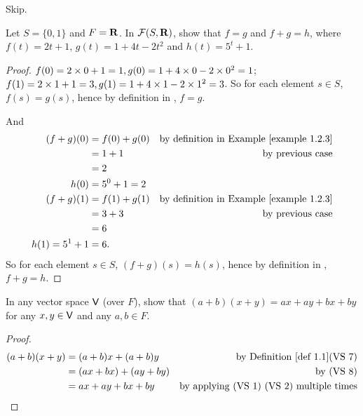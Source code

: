 \begin{exercise} \label{exercise 1.2.6}
Skip.
\end{exercise}

\begin{exercise} \label{exercise 1.2.7}
Let \(S = \{0, 1\}\) and \(F = \mathbf{R}\).
In \(\mathcal{F}(S, \mathbf{R})\), show that \(f = g\) and \(f + g = h\),
where \(f(t) = 2t + 1\), \(g(t) = 1 + 4t - 2t^2\) and \(h(t) = 5^t + 1\).
\end{exercise}

\begin{proof}
\(f(0) = 2 \times 0 + 1 = 1, g(0) = 1 + 4 \times 0 - 2 \times 0^2 = 1\);
\(f(1) = 2 \times 1 + 1 = 3, g(1) = 1 + 4 \times 1 - 2 \times 1^2 = 3\).
So for each element \(s \in S\), \(f(s) = g(s)\), hence by definition in , \(f = g\).

And
\begin{align*}
    (f + g)(0) & = f(0) + g(0) & \text{by definition in \EXAMPLE{1.2.3}} \\
               & = 1 + 1 & \text{by previous case} \\
               & = 2 \\
    h(0) & = 5^0 + 1 = 2 \\
    (f + g)(1) & = f(1) + g(1) & \text{by definition in \EXAMPLE{1.2.3}} \\
               & = 3 + 3 & \text{by previous case} \\
               & = 6 \\
    h(1) = 5^1 + 1 & = 6.
\end{align*}
So for each element \(s \in S\), \((f + g)(s) = h(s)\), hence by definition in , \(f + g = h\).
\end{proof}

\begin{exercise} \label{exercise 1.2.8}
In any vector space \(\textsf{V}\) (over \(F\)), show that \((a + b)(x + y) = ax+ ay + bx + by\) for any \(x, y \in \textsf{V}\) and any \(a, b \in F\).
\end{exercise}

\begin{proof}
\begin{align*}
    (a + b)(x + y) & = (a + b)x + (a + b)y & \text{by \DEF{1.1}(VS 7)} \\
                   & = (ax + bx) + (ay + by) & \text{by (VS 8)} \\
                   & = ax + ay + bx + by & \text{by applying (VS 1) (VS 2) multiple times}
\end{align*}
\end{proof}

